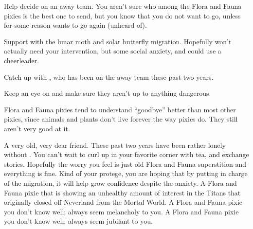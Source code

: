 \documentclass[char]{PP}
\begin{document}
\begin{itemz}
	\item Help \cSHead{} decide on an away team. You aren’t sure who among the Flora and Fauna pixies is the best one to send, but you know that you do not want to go, unless for some reason \cSPM{} wants to go again (unheard of).
	\item Support \cFButterfly{} with the lunar moth and solar butterfly migration. Hopefully \cFButterfly{\they} won’t actually need your intervention, but \cFButterfly{\they} \cFButterfly{\have} some social anxiety, and could use a cheerleader.
	\item Catch up with \cSPM{}, who has been on the away team these past two years.
	\item Keep an eye on \cFTitan{} and make sure they aren’t up to anything dangerous.
\end{itemz}

\begin{itemz}[Notes]
	\item Flora and Fauna pixies tend to understand ``goodbye'' better than most other pixies, since animals and plants don’t live forever the way pixies do. They still aren't very good at it.
\end{itemz}

\begin{contacts}
	\contact{\cSPM{}} A very old, very dear friend. These past two years have been rather lonely without \cSPM{\them}. You can’t wait to curl up in your favorite corner with tea, and exchange stories. Hopefully the worry you feel is just old Flora and Fauna superstition and everything is fine.
	\contact{\cFButterfly{}} Kind of your protege, you are hoping that by putting \cFButterfly{\them} in charge of the migration, it will help grow \cFButterfly{\their} confidence despite the anxiety.
	\contact{\cFTitan{}}  A Flora and Fauna pixie that is showing an unhealthy amount of interest in the Titans that originally closed off Neverland from the Mortal World.
	\contact{\cFWanabe{}} A Flora and Fauna pixie you don’t know well; \cFWanabe{\they} always seem\cFWanabe{\plural} melancholy to you.
	\contact{\cFHeart{}} A Flora and Fauna pixie you don’t know well; \cFHeart{\they} always seem\cFHeart{\plural} jubilant to you.
\end{contacts}
\end{document}
